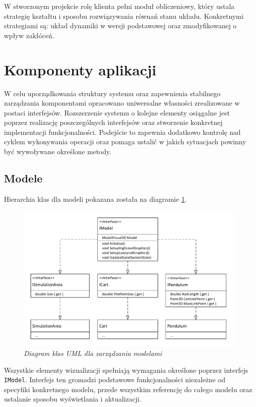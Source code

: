 \documentclass[12pt, oneside]{report}
\theoremstyle{definition}
\begin{document}
W stworzonym projekcie rolę klienta pełni moduł obliczeniowy, który ustala strategię kształtu i sposobu rozwiązywania równań stanu układu. Konkretnymi strategiami są: układ dynamiki w wersji podstawowej oraz zmodyfikowanej o wpływ zakłóceń. 

\section{Komponenty aplikacji}
W celu uporządkowania struktury systemu oraz zapewnienia stabilnego zarządzania komponentami opracowano uniwersalne własności zrealizowane w postaci interfejsów. Rozszerzenie systemu o kolejne elementy osiągalne jest poprzez realizację poszczególnych interfejsów oraz stworzenie konkretnej implementacji funkcjonalności. Podejście to zapewnia dodatkowo kontrolę nad cyklem wykonywania operacji oraz pomaga ustalić w jakich sytuacjach powinny być wywoływane określone metody.

\subsection{Modele}
Hierarchia klas dla modeli pokazana została na diagramie \ref{IModel}.  

\begin{figure}[H]
	\centering
		\includegraphics[width = 400pt]{IModel} 
		\caption{\textit{Diagram klas UML dla zarządzania modelami}}
		\label{IModel}
\end{figure}

Wszystkie elementy wizualizacji spełniają wymagania określone poprzez interfejs \texttt{IModel}. Interfejs ten gromadzi podstawowe funkcjonalności niezależne od specyfiki konkretnego modelu, przede wszystkim referencję do całego modelu oraz ustalanie sposobu wyświetlania i aktualizacji. 
\end{document}
